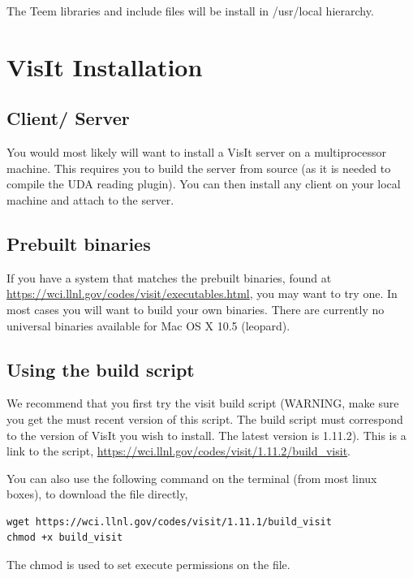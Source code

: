 \documentclass[12pt]{report}
\begin{document}
The Teem libraries and include files will be install in /usr/local hierarchy.

\section{VisIt Installation}

\subsection{Client/ Server}
\label{sec:ClientServer}

You would most likely will want to install a VisIt server on a multiprocessor machine. This requires you to build the server from source (as it is needed to compile the UDA reading plugin). You can then install any client on your local machine and attach to the server. 

\subsection{Prebuilt binaries}
\label{sec:PrebuiltBinaries}

If you have a system that matches the prebuilt binaries, found at \url{https://wci.llnl.gov/codes/visit/executables.html}, you may want to try one. In most cases you will want to build your own binaries. There are currently no universal binaries available for Mac OS X 10.5 (leopard).

\subsection{Using the build script}
\label{sec:UsingTheBuildScript}

We recommend that you first try the visit build script (WARNING, make sure you get the must recent version of this script. The build script must correspond to the version of VisIt you wish to install. The latest version is 1.11.2). This is a link to the script, \url{https://wci.llnl.gov/codes/visit/1.11.2/build\_visit}.

You can also use the following command on the terminal (from most linux boxes), to download the file directly, 

\begin{Verbatim}[fontsize=\footnotesize]
wget https://wci.llnl.gov/codes/visit/1.11.1/build_visit
chmod +x build_visit
\end{Verbatim}

\normalfont The chmod is used to set execute permissions on the file.
\end{document}
